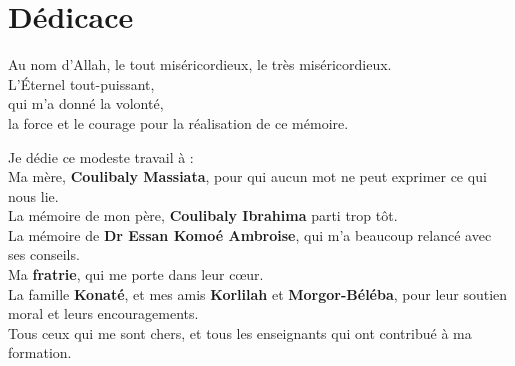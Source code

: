 \documentclass[12pt, oneside]{report} %
\theoremstyle{definition}
\theoremstyle{remark}
\begin{document}
	
	
	
	
	\chapter*{Dédicace}
	\begin{flushright}
		Au nom d'Allah, le tout miséricordieux, le très miséricordieux.\\
		L'Éternel tout-puissant,\\
		qui m'a donné la volonté, \\
    la force et le courage pour la réalisation de ce mémoire.
	\end{flushright}
	\begin{center}
		Je dédie ce modeste travail à : \\
		Ma mère, \textbf{Coulibaly Massiata}, pour qui aucun mot ne peut exprimer ce qui nous lie.\\ 
		La mémoire de mon père, \textbf{Coulibaly Ibrahima} parti trop tôt. \\
		La mémoire de \textbf{Dr Essan Komoé Ambroise}, qui m'a beaucoup relancé avec ses conseils. \\ 
		Ma \textbf{fratrie}, qui me porte dans leur cœur. \\ 
		La famille \textbf{Konaté}, et mes amis \textbf{Korlilah} et \textbf{Morgor-Béléba}, pour leur soutien moral et leurs encouragements.\\
		Tous ceux qui me sont chers, et tous les enseignants qui ont contribué à ma formation. \\  
		
	\end{center} 
\end{document}
